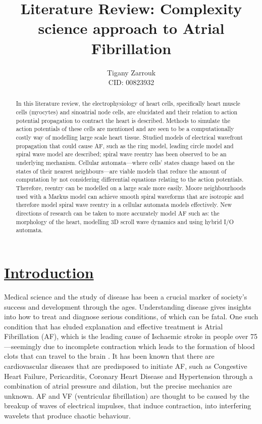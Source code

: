 \documentclass[twocolumn]{article}
\begin{document}
\title {\textbf{Literature Review: Complexity science approach to Atrial Fibrillation}}
\author{Tigany Zarrouk\\ CID: 00823932}
\date{}
\maketitle

\begin{abstract}
In this literature review, the electrophysiology of heart cells, specifically heart muscle cells (myocytes) and sinoatrial node cells, are elucidated and their relation to action potential propagation to contract the heart is described. Methods to simulate the action potentials of these cells are mentioned and are seen to be a computationally costly way of modelling large scale heart tissue. Studied models of electrical wavefront propagation that could cause AF, such as the ring model, leading circle model and spiral wave model are described; spiral wave reentry has been observed to be an underlying mechanism. Cellular automata---where cells' states change based on the states of their nearest neighbours---are viable models that reduce the amount of computation by not considering differential equations relating to the action potentials. Therefore, reentry can be modelled on a large scale more easily. Moore neighbourhoods used with a Markus model can achieve smooth spiral waveforms that are isotropic and therefore model spiral wave reentry in a cellular automata models effectively. New directions of research can be taken to more accurately model AF such as: the morphology of the heart, modelling 3D scroll wave dynamics and using hybrid I/O automata. 

\end{abstract}


\section{\textbf{\underline{Introduction}}}

Medical science and the study of disease has been a crucial marker of society's success and development through the ages. Understanding disease gives insights into how to treat and diagnose serious conditions, of which can be fatal. One such condition that has eluded explanation and effective treatment is Atrial Fibrillation (AF), which is the leading cause of Ischaemic stroke in people over 75---seemingly due to incomplete contraction which leads to the formation of blood clots that can travel to the brain \cite{Hart}. It has been known that there are cardiovascular diseases that are predisposed to initiate AF, such as Congestive Heart Failure, Pericarditis, Coronary Heart Disease and Hypertension through a combination of atrial pressure and dilation, but the precise mechanics are unknown. AF and VF (ventricular fibrillation) are thought to be caused by the breakup of waves of electrical impulses, that induce contraction, into interfering wavelets that produce chaotic behaviour. 
\end{document}
